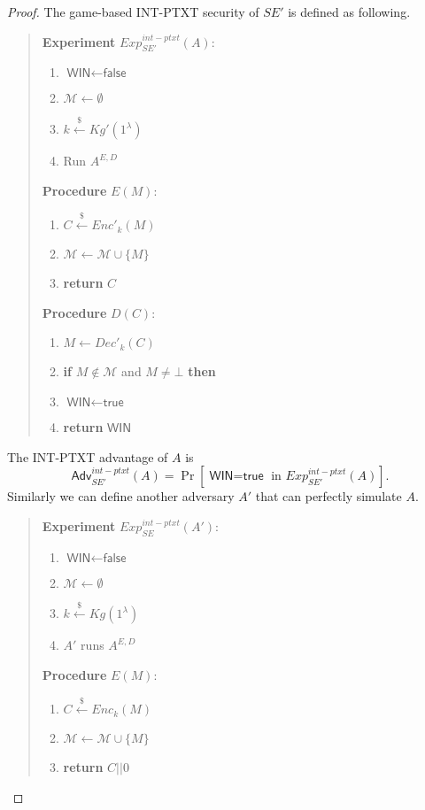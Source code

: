 \documentclass[12pt]{article}
\newcommand{\getsr}{\stackrel{\$}{\gets}}
\newcommand{\Adv}{\textsf{Adv}}
\newcommand{\tab}{\hspace{0.3in}}
\newcommand{\WIN}{\textsf{WIN}}
\newcommand{\true}{\textsf{true}}
\newcommand{\false}{\textsf{false}}
\newcommand{\M}{\mathcal{M}}
\theoremstyle{definition}
\begin{document}
\begin{proof}
The game-based INT-PTXT security of $SE'$ is defined as following.
\begin{quote}
\begin{minipage}[t]{0.35\textwidth}
{\bf Experiment} $Exp_{SE'}^{int-ptxt}(A)$:
\begin{enumerate}
\item $\WIN \gets \false$
\item $\M \gets \emptyset$
\item $k \getsr Kg'(1^\lambda)$
\item Run $A^{E,D}$
\end{enumerate}
\end{minipage}
\begin{minipage}[t]{0.5\textwidth}
{\bf Procedure} $E(M)$:
\begin{enumerate}
\item $C \getsr Enc'_k(M)$
\item $\M \gets \M \cup \{M\}$
\item {\bf return} $C$
\end{enumerate}
\end{minipage}

\begin{minipage}[t]{0.5\textwidth}
{\bf Procedure} $D(C)$:
\begin{enumerate}
\item $M \gets Dec'_k(C)$
\item {\bf if} $M \not\in \M$ and $M \not=\bot$ {\bf then}
\item \tab $\WIN \gets \true$
\item {\bf return} $\WIN$
\end{enumerate}
\end{minipage}
\end{quote}
The INT-PTXT advantage of $A$ is
$$\Adv_{SE'}^{int-ptxt}(A) = \Pr[\textrm{$\WIN = \true$ in $Exp_{SE'}^{int-ptxt}(A)$}].$$
Similarly we can define another adversary $A'$ that can perfectly simulate $A$.
\begin{quote}
\begin{minipage}[t]{0.35\textwidth}
{\bf Experiment} $Exp_{SE}^{int-ptxt}(A')$:
\begin{enumerate}
\item $\WIN \gets \false$
\item $\M \gets \emptyset$
\item $k \getsr Kg(1^\lambda)$
\item $A'$ runs $A^{E,D}$
\end{enumerate}
\end{minipage}
\begin{minipage}[t]{0.5\textwidth}
{\bf Procedure} $E(M)$:
\begin{enumerate}
\item $C \getsr Enc_k(M)$
\item $\M \gets \M \cup \{M\}$
\item {\bf return} $C||0$
\end{enumerate}
\end{minipage}


\end{quote}
\end{proof}
\end{document}
